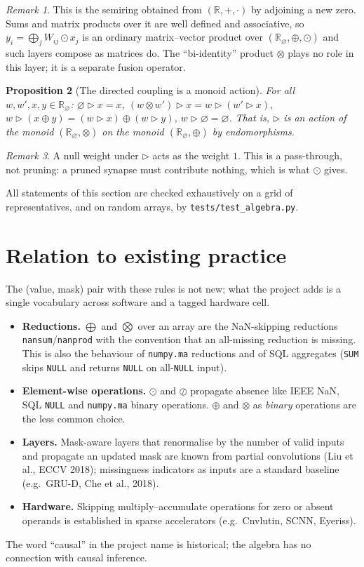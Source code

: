 \documentclass[11pt,a4paper]{article}
\newtheorem{proposition}{Proposition}
\theoremstyle{definition}
\theoremstyle{remark}
\newtheorem{remark}[proposition]{Remark}
\newcommand{\R}{\mathbb{R}}
\newcommand{\Rn}{\R_{\varnothing}}
\newcommand{\nul}{\varnothing}
\newcommand{\op}{\oplus}
\newcommand{\ot}{\otimes}
\newcommand{\od}{\odot}
\newcommand{\sk}{\rhd}
\begin{document}
\begin{remark}
This is the semiring obtained from $(\R,+,\cdot)$ by adjoining a new zero. Sums
and matrix products over it are well defined and associative, so
$y_i=\bigoplus_j W_{ij}\od x_j$ is an ordinary matrix--vector product over
$(\Rn,\op,\od)$ and such layers compose as matrices do. The ``bi-identity''
product $\ot$ plays no role in this layer; it is a separate fusion operator.
\end{remark}

\begin{proposition}[The directed coupling is a monoid action]\label{prop:action}
For all $w,w',x,y\in\Rn$:\;
$\nul\sk x=x$,\; $(w\ot w')\sk x=w\sk(w'\sk x)$,\;
$w\sk(x\op y)=(w\sk x)\op(w\sk y)$,\; $w\sk\nul=\nul$.
That is, $\sk$ is an action of the monoid $(\Rn,\ot)$ on the monoid $(\Rn,\op)$
by endomorphisms.
\end{proposition}

\begin{remark}
A null weight under $\sk$ acts as the weight $1$. This is a pass-through, not
pruning: a pruned synapse must contribute nothing, which is what $\od$ gives.
\end{remark}

All statements of this section are checked exhaustively on a grid of
representatives, and on random arrays, by \texttt{tests/test\_algebra.py}.

\section{Relation to existing practice}

The (value, mask) pair with these rules is not new; what the project adds is a
single vocabulary across software and a tagged hardware cell.
\begin{itemize}
\item \textbf{Reductions.} $\bigoplus$ and $\bigotimes$ over an array are the
  NaN-skipping reductions \texttt{nansum}/\texttt{nanprod} with the convention
  that an all-missing reduction is missing. This is also the behaviour of
  \texttt{numpy.ma} reductions and of SQL aggregates
  (\texttt{SUM} skips \texttt{NULL} and returns \texttt{NULL} on all-\texttt{NULL}
  input).
\item \textbf{Element-wise operations.} $\od$ and $\oslash$ propagate absence
  like IEEE NaN, SQL \texttt{NULL} and \texttt{numpy.ma} binary operations.
  $\op$ and $\ot$ as \emph{binary} operations are the less common choice.
\item \textbf{Layers.} Mask-aware layers that renormalise by the number of
  valid inputs and propagate an updated mask are known from partial
  convolutions (Liu et al., ECCV 2018); missingness indicators as inputs are
  a standard baseline (e.g.\ GRU-D, Che et al., 2018).
\item \textbf{Hardware.} Skipping multiply--accumulate operations for zero or
  absent operands is established in sparse accelerators (e.g.\ Cnvlutin,
  SCNN, Eyeriss).
\end{itemize}
The word ``causal'' in the project name is historical; the algebra has no
connection with causal inference.
\end{document}
